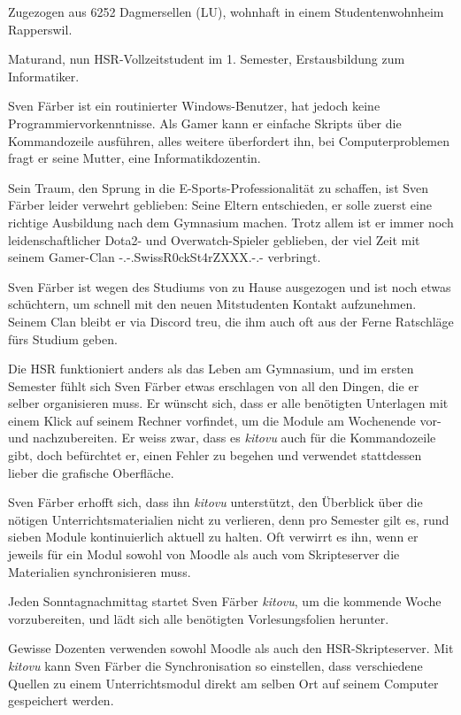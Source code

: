 \documentclass[a4paper]{article}
\begin{document}
\begin{description}[uclist]
	\item[Adresse] Zugezogen aus 6252 Dagmersellen (LU), wohnhaft in einem Studentenwohnheim Rapperswil.
	\item[Ausbildung und Beruf] Maturand, nun HSR-Vollzeitstudent im 1. Semester, Erstausbildung zum Informatiker.
	\item[Informatikkenntnisse] Sven Färber ist ein routinierter Windows-Benutzer, hat jedoch keine Programmiervorkenntnisse. Als Gamer kann er einfache Skripts über die Kommandozeile ausführen, alles weitere überfordert ihn, bei Computerproblemen fragt er seine Mutter, eine Informatikdozentin.
	\item[Freizeitbeschäftigung] Sein Traum, den Sprung in die E-Sports-Professionalität zu schaffen, ist Sven Färber leider verwehrt geblieben: Seine Eltern entschieden, er solle zuerst eine richtige Ausbildung nach dem Gymnasium machen. Trotz allem ist er immer noch leidenschaftlicher Dota2- und Overwatch-Spieler geblieben, der viel Zeit mit seinem Gamer-Clan -.-.SwissR0ckSt4rZXXX.-.- verbringt.
	\item[Persönlichkeit] Sven Färber ist wegen des Studiums von zu Hause ausgezogen und ist noch etwas schüchtern, um schnell mit den neuen Mitstudenten Kontakt aufzunehmen. Seinem Clan bleibt er via Discord treu, die ihm auch oft aus der Ferne Ratschläge fürs Studium geben. 
	\item[Einschränkungen, Ziele und Wünsche] Die HSR funktioniert anders als das Leben am Gymnasium, und im ersten Semester fühlt sich Sven Färber etwas erschlagen von all den Dingen, die er selber organisieren muss. Er wünscht sich, dass er alle benötigten Unterlagen mit einem Klick auf seinem Rechner vorfindet, um die Module am Wochenende vor- und nachzubereiten. Er weiss zwar, dass es \emph{kitovu} auch für die Kommandozeile gibt, doch befürchtet er, einen Fehler zu begehen und verwendet stattdessen lieber die grafische Oberfläche.
	\item[Erwartungen an \emph{kitovu}] Sven Färber erhofft sich, dass ihn \emph{kitovu} unterstützt, den Überblick über die nötigen Unterrichtsmaterialien nicht zu verlieren, denn pro Semester gilt es, rund sieben Module kontinuierlich aktuell zu halten. Oft verwirrt es ihn, wenn er jeweils für ein Modul sowohl von Moodle als auch vom Skripteserver die Materialien synchronisieren muss.
	\item[Szenario: ``Beschäftigter Vollzeitstudent''] Jeden Sonntagnachmittag startet Sven Färber \emph{kitovu}, um die kommende Woche vorzubereiten, und lädt sich alle benötigten Vorlesungsfolien herunter.
	\item[Szenario: ``Viele Plattformen''] Gewisse Dozenten verwenden sowohl Moodle als auch den HSR-Skripteserver. Mit \emph{kitovu} kann Sven Färber die Synchronisation so einstellen, dass verschiedene Quellen zu einem Unterrichtsmodul direkt am selben Ort auf seinem Computer gespeichert werden.
\end{description}
\end{document}
